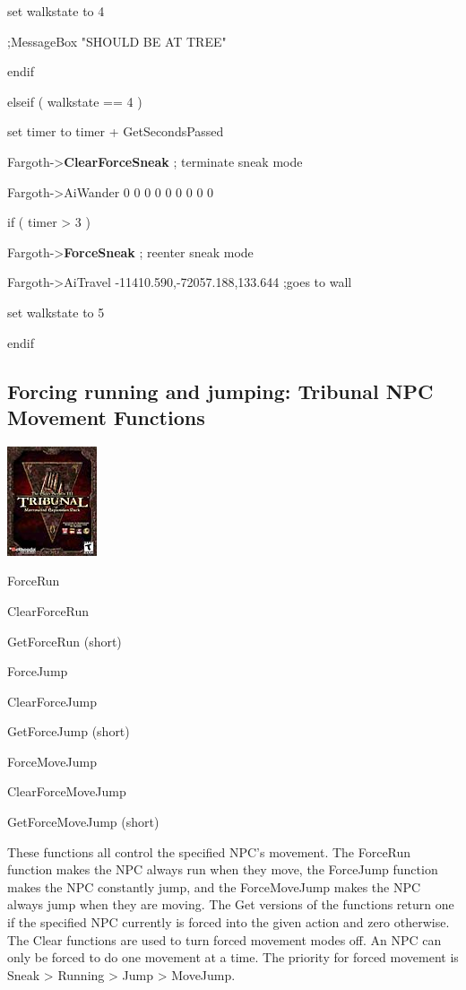 \documentclass[
]{article}
\begin{document}
set walkstate to 4

;MessageBox "SHOULD BE AT TREE"

endif

elseif ( walkstate == 4 )

set timer to timer + GetSecondsPassed

Fargoth-\textgreater{}\textbf{ClearForceSneak} ; terminate sneak mode

Fargoth-\textgreater AiWander 0 0 0 0 0 0 0 0 0

if ( timer \textgreater{} 3 )

Fargoth-\textgreater{}\textbf{ForceSneak} ; reenter sneak mode

Fargoth-\textgreater AiTravel -11410.590,-72057.188,133.644 ;goes to
wall

set walkstate to 5

endif

\hypertarget{forcing-running-and-jumping-tribunal-npc-movement-functions}{%
\subsection{\texorpdfstring{\hfill\break
Forcing running and jumping: Tribunal NPC Movement
Functions}{ Forcing running and jumping: Tribunal NPC Movement Functions}}\label{forcing-running-and-jumping-tribunal-npc-movement-functions}}

\includegraphics{media/image6.png}

ForceRun

ClearForceRun

GetForceRun (short)

ForceJump

ClearForceJump

GetForceJump (short)

ForceMoveJump

ClearForceMoveJump

GetForceMoveJump (short)

These functions all control the specified NPC's movement. The ForceRun
function makes the NPC always run when they move, the ForceJump function
makes the NPC constantly jump, and the ForceMoveJump makes the NPC
always jump when they are moving. The Get versions of the functions
return one if the specified NPC currently is forced into the given
action and zero otherwise. The Clear functions are used to turn forced
movement modes off. An NPC can only be forced to do one movement at a
time. The priority for forced movement is Sneak \textgreater{} Running
\textgreater{} Jump \textgreater{} MoveJump.
\end{document}

